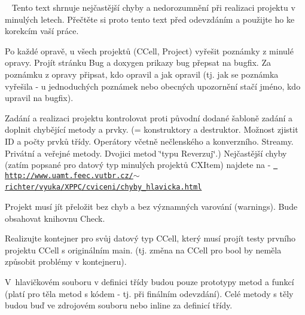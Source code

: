 ~\newline
Tento text shrnuje nejčastější chyby a nedorozumnění při realizaci projektu v minulých letech. Přečtěte si proto tento text před odevzdáním a použijte ho ke korekcím vaší práce.


\begin{DoxyEnumerate}
\item Po každé opravě, u všech projektů (C\+Cell, Project) vyřešit poznámky z minulé opravy. Projít stránku Bug a doxygen prikazy bug přepsat na bugfix. Za poznámku z opravy připsat, kdo opravil a jak opravil (tj. jak se poznámka vyřešila -\/ u jednoduchých poznámek nebo obecných upozornění stačí jméno, kdo upravil na bugfix). ~\newline
~\newline

\item Zadání a realizaci projektu kontrolovat proti původní dodané šabloně zadání a doplnit chybějící metody a prvky. (= konstruktory a destruktor. Možnost zjistit ID a počty prvků třídy. Operátory včetně nečlenského a konverzního. Streamy. Privátní a veřejné metody. Dvojici metod \char`\"{}typu Reverzuj\char`\"{}.) Nejčastější chyby (zatím popsané pro datový typ minulých projektů C\+X\+Item) najdete na -\/ \href{http://www.uamt.feec.vutbr.cz/\%7Erichter/vyuka/1920_XPPC/cviceni/chyby_hlavicka.html}{\texttt{ http\+://www.\+uamt.\+feec.\+vutbr.\+cz/$\sim$richter/vyuka/\+X\+P\+P\+C/cviceni/chyby\+\_\+hlavicka.\+html}}~\newline
~\newline

\item Projekt musí jít přeložit bez chyb a bez významných varování (warnings). Bude obsahovat knihovnu Check.~\newline
~\newline

\item Realizujte kontejner pro svůj datový typ C\+Cell, který musí projít testy prvního projektu C\+Cell s originálním main. (tj. změna na C\+Cell pro bool by neměla způsobit problémy v kontejneru).~\newline
~\newline

\item V~hlavičkovém souboru v definici třídy budou pouze prototypy metod a funkcí (platí pro těla metod s kódem -\/ tj. při finálním odevzdání). Celé metody s těly budou buď ve zdrojovém souboru nebo inline za definicí třídy.~\newline
~\newline


\end{DoxyEnumerate}

